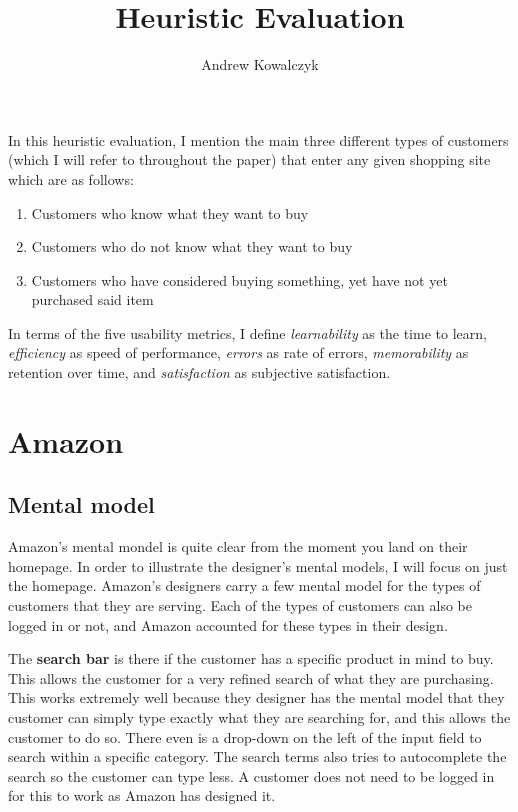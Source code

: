 \documentclass[11pt, oneside]{article}
\title{Heuristic Evaluation}
\author{Andrew Kowalczyk}
\begin{document}
\maketitle

In this heuristic evaluation, I mention the main three different types of customers (which I will refer to throughout the paper) that enter any given shopping site which are as follows:
\begin{enumerate}
\item Customers who know what they want to buy 
\item Customers who do not know what they want to buy
\item Customers who have considered buying something, yet have not yet purchased said item
\end{enumerate}

In terms of the five usability metrics, I define \textit{learnability} as the time to learn, \textit{efficiency} as speed of performance, \textit{errors} as rate of errors, \textit{memorability} as retention over time, and \textit{satisfaction} as subjective satisfaction.
\pagebreak

\section{Amazon}

\subsection{Mental model}

Amazon's mental mondel is quite clear from the moment you land on their homepage. In order to illustrate the designer's mental models, I will focus on just the homepage. Amazon's designers carry a few mental model for the types of customers that they are serving. Each of the types of customers can also be logged in or not, and Amazon accounted for these types in their design.

The \textbf{search bar} is there if the customer has a specific product in mind to buy. This allows the customer for a very refined search of what they are purchasing. This works extremely well because they designer has the mental model that they customer can simply type exactly what they are searching for, and this allows the customer to do so. There even is a drop-down on the left of the input field to search within a specific category. The search terms also tries to autocomplete the search so the customer can type less. A customer does not need to be logged in for this to work as Amazon has designed it.
\end{document}
